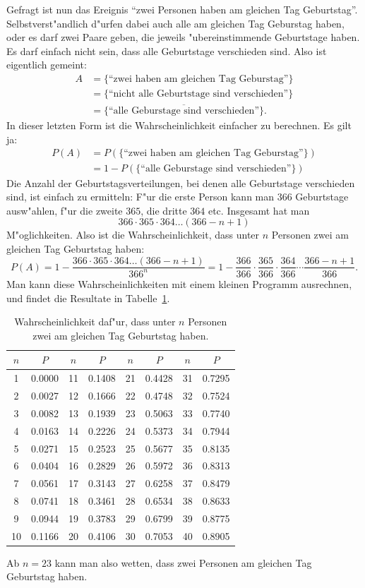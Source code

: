Gefragt ist nun das Ereignis
``zwei Personen haben am gleichen Tag Geburtstag''.
Selbstverst"andlich d"urfen dabei auch alle am gleichen Tag
Geburstag haben, oder es darf zwei Paare geben, die jeweils
"ubereinstimmende Geburtstage haben. Es darf einfach nicht
sein, dass alle Geburtstage verschieden sind. Also ist eigentlich
gemeint:
\begin{align*}
A&=\{\text{``zwei haben am gleichen Tag Geburstag''}\}\\
&=\{\text{``nicht alle Geburtstage sind verschieden''}\}\\
&=\overline{\{\text{``alle Geburstage sind verschieden''}\}}.
\end{align*}
In dieser letzten Form ist die Wahrscheinlichkeit einfacher zu
berechnen. Es gilt ja:
\begin{align*}
P(A)&=P(\{\text{``zwei haben am gleichen Tag Geburstag''}\})\\
&=1-P(\{\text{``alle Geburstage sind verschieden''}\})
\end{align*}
Die Anzahl der Geburtstagsverteilungen, bei denen alle Geburtstage
verschieden sind, ist einfach zu ermitteln: F"ur die erste Person
kann man $366$ Geburtstage ausw"ahlen, f"ur die zweite $365$, die
dritte $364$ etc. Insgesamt hat man
\[
366\cdot365\cdot364\dots(366-n+1)
\]
M"oglichkeiten. Also ist die Wahrscheinlichkeit, dass unter $n$
Personen zwei am gleichen Tag Geburtstag haben:
\[
P(A)
=
1-\frac{366\cdot365\cdot364\dots(366-n+1)}{366^n}
=
1-\frac{366}{366}\cdot
\frac{365}{366}\cdot
\frac{364}{366}
\cdots
\frac{366-n+1}{366}
.
\]
Man kann diese Wahrscheinlichkeiten mit einem kleinen Programm
ausrechnen, und findet die Resultate in
Tabelle~\ref{geburtstagswahrscheinlichkeit}.
\begin{table}
\begin{center}
\begin{tabular}{|c|c|c|c|c|c|c|c|}
\hline
$n$&$P$&$n$&$P$&$n$&$P$&$n$&$P$\\
\hline
1&0.0000
&11&0.1408
&21&0.4428
&31&0.7295\\
2&0.0027
&12&0.1666
&22&0.4748
&32&0.7524\\
3&0.0082
&13&0.1939
&23&0.5063
&33&0.7740\\
4&0.0163
&14&0.2226
&24&0.5373
&34&0.7944\\
5&0.0271
&15&0.2523
&25&0.5677
&35&0.8135\\
6&0.0404
&16&0.2829
&26&0.5972
&36&0.8313\\
7&0.0561
&17&0.3143
&27&0.6258
&37&0.8479\\
8&0.0741
&18&0.3461
&28&0.6534
&38&0.8633\\
9&0.0944
&19&0.3783
&29&0.6799
&39&0.8775\\
10&0.1166
&20&0.4106
&30&0.7053
&40&0.8905\\
\hline
\end{tabular}
\end{center}
\caption{Wahrscheinlichkeit daf"ur, dass unter $n$ Personen zwei
am gleichen Tag Geburtstag haben.\label{geburtstagswahrscheinlichkeit}}
\end{table}
Ab $n=23$ kann man also wetten, dass zwei Personen am gleichen Tag
Geburtstag haben.

